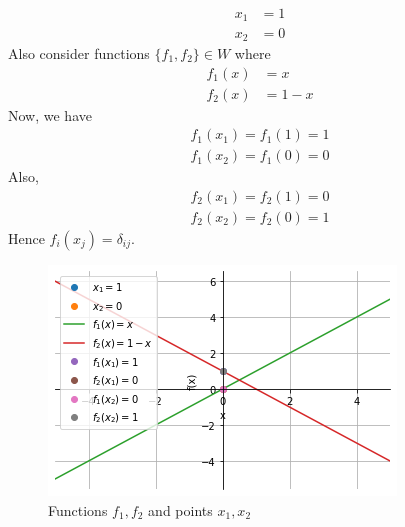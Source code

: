 \begin{align}
x_1&=1\\
x_2&=0
\end{align}
Also consider functions $\{f_1, f_2\} \in W$ where
\begin{align}
f_1(x) &= x\\
f_2(x) &= 1-x
\end{align}
Now, we have
\begin{align}
f_1(x_1) = f_1(1) = 1\\
f_1(x_2) = f_1(0) = 0
\end{align}
Also,
\begin{align}
f_2(x_1) = f_2(1) = 0\\
f_2(x_2) = f_2(0) = 1
\end{align}
Hence $f_i(x_j) = \delta_{ij}$.
\begin{figure}[h!]
\includegraphics[width=\columnwidth]{solutions/3/6/3/fig/fig.png}
\caption{Functions $f_1,f_2$ and points $x_1,x_2$}
\label{eq:solutions/3/6/3/fig/3}
\end{figure}
